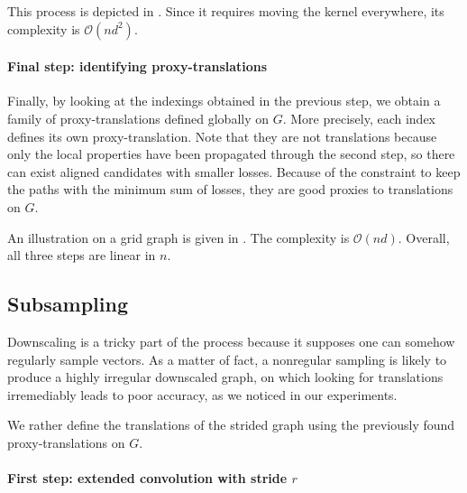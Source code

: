 This process is depicted in . Since it requires moving the kernel everywhere, its complexity is $\mathcal{O}(n d^2)$.



\paragraph{Final step: identifying proxy-translations}

Finally, by looking at the indexings obtained in the previous step, we obtain a family of proxy-translations defined globally on $G$. More precisely, each index defines its own proxy-translation. Note that they are not translations because only the local properties have been propagated through the second step, so there can exist aligned candidates with smaller losses. Because of the constraint to keep the paths with the minimum sum of losses, they are good proxies to translations on $G$.

An illustration on a grid graph is given in . The complexity is $\mathcal{O}(nd)$. Overall, all three steps are linear in $n$.



\subsection{Subsampling}

Downscaling is a tricky part of the process because it supposes one can somehow regularly sample vectors. As a matter of fact, a nonregular sampling is likely to produce a highly irregular downscaled graph, on which looking for translations irremediably leads to poor accuracy, as we noticed in our experiments.%

We rather define the translations of the strided graph using the previously found proxy-translations on $G$.

\paragraph{First step: extended convolution with stride $r$}

